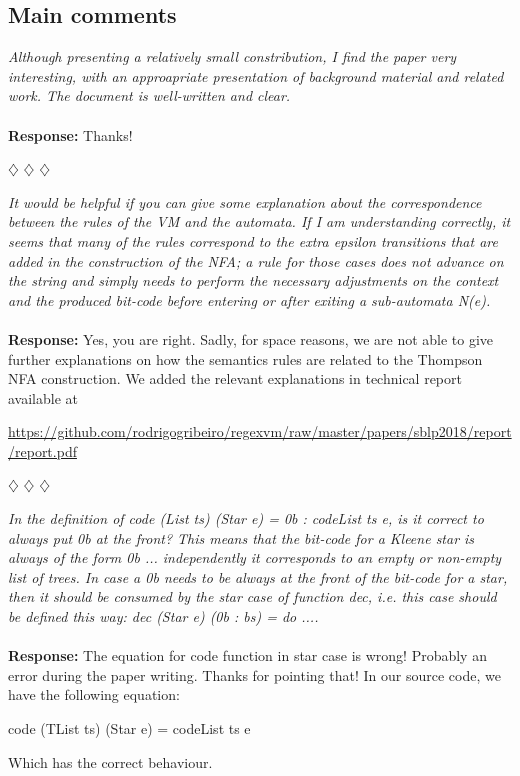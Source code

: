 \documentclass{article}
\newcommand{\separador}{\begin{center}
$\diamondsuit$ $\diamondsuit$ $\diamondsuit$
\end{center}}
\newcommand{\report}{\begin{center}\url{https://github.com/rodrigogribeiro/regexvm/raw/master/papers/sblp2018/report/report.pdf}\end{center}}
\begin{document}
\subsection*{Main comments}

\noindent\textit{Although presenting a relatively small constribution, I find the paper very interesting, with an
approapriate presentation of background material and related work. The document is well-written and clear.}
\\
\\
\noindent\textbf{Response:} Thanks!

\separador

\noindent\textit{It would be helpful if you can give some explanation about the correspondence between the rules of the VM and the automata.
If I am understanding correctly, it seems that many of the rules correspond to the extra epsilon transitions that are added in the
construction of the NFA; a rule for those cases does not advance on the string and simply needs to perform the necessary adjustments
on the context and the produced bit-code before entering or after exiting a sub-automata N(e).}
\\
\\
\noindent\textbf{Response:} Yes, you are right. Sadly, for space reasons, we are not able to give further explanations on how the
semantics rules are related to the Thompson NFA construction. We added the relevant explanations in technical report available at

\report

\separador

\noindent\textit{In the definition of code (List ts) (Star e) = 0b : codeList ts e, is it correct to always put 0b at the front? This means
that the bit-code for a Kleene star is always of the form 0b ... independently it corresponds to an empty or non-empty list of
trees. In case a 0b needs to be always at the front of the bit-code for a star, then it should be consumed by the star case of
function dec, i.e. this case should be defined this way:
dec (Star e) (0b : bs) = do ....
}
\\
\\
\noindent\textbf{Response:} The equation for code function in star case is wrong! Probably an error during the paper writing.
Thanks for pointing that! In our source code, we have the following equation:

code (TList ts) (Star e) = codeList ts e

Which has the correct behaviour.
\end{document}
